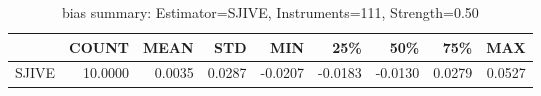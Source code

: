\begin{table}[ht]
\centering
\caption{bias summary: Estimator=SJIVE, Instruments=111, Strength=0.50}
\begin{tabular}{lrrrrrrrr}
\toprule
 & COUNT & MEAN & STD & MIN & 25\% & 50\% & 75\% & MAX \\
\midrule
SJIVE & 10.0000 & 0.0035 & 0.0287 & -0.0207 & -0.0183 & -0.0130 & 0.0279 & 0.0527 \\
\bottomrule
\end{tabular}
\end{table}

